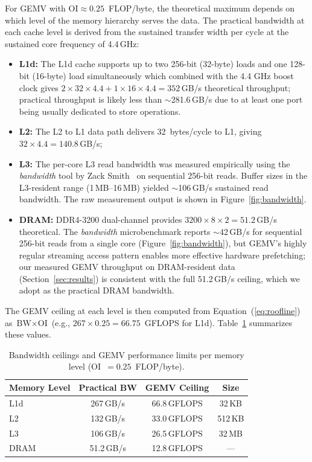 \documentclass[runningheads]{llncs}
\begin{document}
For GEMV with $\text{OI} \approx 0.25$~FLOP/byte, the theoretical maximum
depends on which level of the memory hierarchy serves the data. The practical
bandwidth at each cache level is derived from the sustained transfer width per
cycle at the sustained core frequency of 4.4\,GHz:
\begin{itemize}
  \item \textbf{L1d:} The L1d cache supports up to two 256-bit (32-byte) loads and one 128-bit (16-byte) load simultaneously which combined with the 4.4 GHz boost clock gives
      $2 \times 32 \times 4.4 + 1 \times 16 \times 4.4 = 352$\,GB/s theoretical throughput; practical
      throughput is likely less than $\sim$281.6\,GB/s due to at least one port being usually dedicated to store operations.\cite{amdsog}
\item \textbf{L2:} The L2 to L1 data path delivers 32~bytes/cycle to L1, giving
  $32 \times 4.4 = 140.8$\,GB/s;\cite{amdsog}
\item \textbf{L3:} The per-core L3 read bandwidth was measured empirically using
      the \textit{bandwidth} tool by Zack Smith~\cite{bandwidth} on sequential
      256-bit reads. Buffer sizes in the L3-resident range (1\,MB--16\,MB)
      yielded $\sim$106\,GB/s sustained read bandwidth. The raw measurement
      output is shown in Figure~\ref{fig:bandwidth}.
\item \textbf{DRAM:} DDR4-3200 dual-channel provides
      $3200 \times 8 \times 2 = 51.2$\,GB/s theoretical. The
      \textit{bandwidth} microbenchmark reports $\sim$42\,GB/s for
      sequential 256-bit reads from a single core
      (Figure~\ref{fig:bandwidth}), but GEMV's highly regular streaming
      access pattern enables more effective hardware prefetching; our
      measured GEMV throughput on DRAM-resident data
      (Section~\ref{sec:results}) is consistent with the full 51.2\,GB/s
      ceiling, which we adopt as the practical DRAM bandwidth.
\end{itemize}
The GEMV ceiling at each level is then computed from Equation~(\ref{eq:roofline})
as $\text{BW} \times \text{OI}$ (e.g., $267 \times 0.25 = 66.75$~GFLOPS for
L1d). Table~\ref{tab:ceilings} summarizes these values.


\begin{table}[t]
\centering
\caption{Bandwidth ceilings and GEMV performance limits per memory level
(OI~$= 0.25$~FLOP/byte).}
\label{tab:ceilings}
\begin{tabular}{@{}l c c c@{}}
\toprule
\textbf{Memory Level} & \textbf{Practical BW} &
  \textbf{GEMV Ceiling} & \textbf{Size} \\
\midrule
L1d   & 267\,GB/s  & 66.8\,GFLOPS & 32\,KB  \\
L2    & 132\,GB/s  & 33.0\,GFLOPS & 512\,KB \\
L3    & 106\,GB/s  & 26.5\,GFLOPS & 32\,MB  \\
DRAM  & 51.2\,GB/s & 12.8\,GFLOPS & ---     \\
\bottomrule
\end{tabular}
\end{table}
\end{document}

